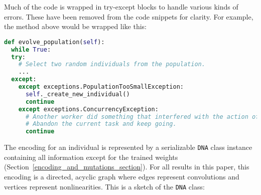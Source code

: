\documentclass{article}
\begin{document}
Much of the code is wrapped in try-except blocks to handle various kinds of errors. These have been removed from the code snippets for clarity. For example, the method above would be wrapped like this:
\smallskip
\begin{lstlisting}[language=Python]
def evolve_population(self):
  while True:
  try:
    # Select two random individuals from the population.
    ...
  except:
    except exceptions.PopulationTooSmallException:
      self._create_new_individual()
      continue
    except exceptions.ConcurrencyException:
      # Another worker did something that interfered with the action of this worker.
      # Abandon the current task and keep going.
      continue
\end{lstlisting}

The encoding for an individual is represented by a serializable \lstinline{DNA} class instance containing all information except for the trained weights (Section~\ref{encoding_and_mutations_section}). For all results in this paper, this encoding is a directed, acyclic graph where edges represent convolutions and vertices represent nonlinearities. This is a sketch of the \lstinline{DNA} class:
\smallskip
\end{document}
